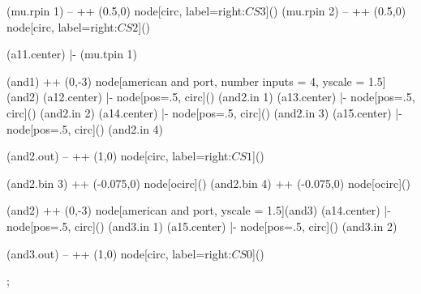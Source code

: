 \begin{page}
\begin{circuitikz}
		(mu.rpin 1) -- ++ (0.5,0) node[circ, label=right:$CS3$](){}
		(mu.rpin 2) -- ++ (0.5,0) node[circ, label=right:$CS2$](){}
		
		(a11.center) |- (mu.tpin 1)
		
		
		(and1) ++ (0,-3) node[american and port, number inputs = 4, yscale = 1.5](and2){}
		(a12.center) |- node[pos=.5, circ](){} (and2.in 1)
		(a13.center) |- node[pos=.5, circ](){} (and2.in 2)
		(a14.center) |- node[pos=.5, circ](){} (and2.in 3)
		(a15.center) |- node[pos=.5, circ](){} (and2.in 4)
		
		(and2.out) -- ++ (1,0) node[circ, label=right:$CS1$](){}
		
		(and2.bin 3) ++ (-0.075,0) node[ocirc](){}
		(and2.bin 4) ++ (-0.075,0) node[ocirc](){}
		
		(and2) ++ (0,-3) node[american and port, yscale = 1.5](and3){}
		(a14.center) |- node[pos=.5, circ](){} (and3.in 1)
		(a15.center) |- node[pos=.5, circ](){} (and3.in 2)
		
		(and3.out) -- ++ (1,0) node[circ, label=right:$CS0$](){}
		
		
		
		
		

		
		
		
			
		
	;

%	

\end{circuitikz}
\end{page}






